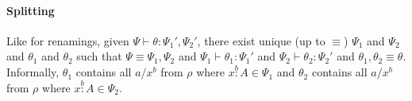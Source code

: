 \documentclass{amsart}
\let\types\vdash %
\let\mypm\pm
\def\pm{^\mypm}
\def\ps{+}
\def\ms{-}
\def\pms{\mypm}
\def\flip#1{#1^*} %
\def\pmcol{\overset{\scriptscriptstyle \pm}{:}}
\newcommand\vcol[1]{\overset{\scriptscriptstyle #1}{:}}
\newcommand\combine{,}
\begin{document}
\paragraph{Splitting} Like for renamings, given $\Psi \vdash \theta : \Psi_1' \combine \Psi_2'$, 
there exist unique (up to $\equiv$) $\Psi_1$ and $\Psi_2$ and $\theta_1$
and $\theta_2$ such that $\Psi \equiv \Psi_1 \combine \Psi_2$ and
$\Psi_1 \vdash \theta_1 : \Psi_1'$ and $\Psi_2 \vdash \theta_2 :
\Psi_2'$ and $\theta_1 \combine \theta_2 \equiv \theta$.  Informally,
$\theta_1$ contains all $a/x^b$ from $\rho$ where $x \vcol b A \in
\Psi_1$ and $\theta_2$ contains all $a/x^b$ from $\rho$ where $x \vcol b
A \in \Psi_2$.




\end{document}
